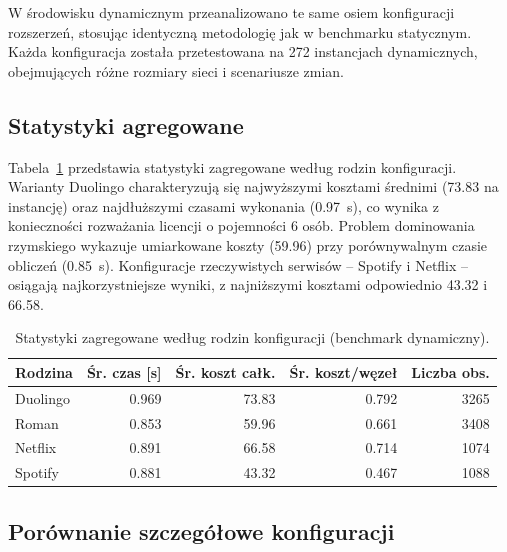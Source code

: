 W środowisku dynamicznym przeanalizowano te same osiem konfiguracji rozszerzeń, stosując identyczną metodologię jak w benchmarku statycznym. Każda konfiguracja została przetestowana na 272 instancjach dynamicznych, obejmujących różne rozmiary sieci i scenariusze zmian.

\subsection{Statystyki agregowane}

Tabela~\ref{tab:ext-dynamic-family} przedstawia statystyki zagregowane według rodzin konfiguracji. Warianty Duolingo charakteryzują się najwyższymi kosztami średnimi (73.83 na instancję) oraz najdłuższymi czasami wykonania (0.97~s), co wynika z konieczności rozważania licencji o pojemności 6 osób. Problem dominowania rzymskiego wykazuje umiarkowane koszty (59.96) przy porównywalnym czasie obliczeń (0.85~s). Konfiguracje rzeczywistych serwisów -- Spotify i Netflix -- osiągają najkorzystniejsze wyniki, z najniższymi kosztami odpowiednio 43.32 i 66.58.

\begin{table}[H]
  \centering
  \caption{Statystyki zagregowane według rodzin konfiguracji (benchmark dynamiczny).}
  \label{tab:ext-dynamic-family}
  \begin{tabular}{lrrrr}
    \toprule
    \textbf{Rodzina} & \textbf{Śr. czas [s]} & \textbf{Śr. koszt całk.} & \textbf{Śr. koszt/węzeł} & \textbf{Liczba obs.} \\
    \midrule
    Duolingo         & 0.969                 & 73.83                    & 0.792                    & 3265                 \\
    Roman            & 0.853                 & 59.96                    & 0.661                    & 3408                 \\
    Netflix          & 0.891                 & 66.58                    & 0.714                    & 1074                 \\
    Spotify          & 0.881                 & 43.32                    & 0.467                    & 1088                 \\
    \bottomrule
  \end{tabular}
\end{table}

\subsection{Porównanie szczegółowe konfiguracji}

